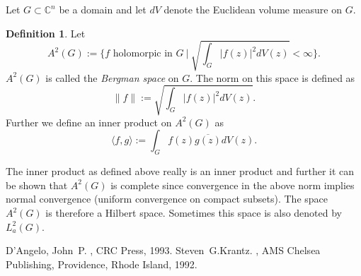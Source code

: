 \documentclass[12pt]{article}
\theoremstyle{theorem}
\theoremstyle{definition}
\newtheorem*{defn}{Definition}
\begin{document}
Let $G \subset {\mathbb{C}}^n$ be a domain and let
$dV$ denote the Euclidean volume measure on $G$.

\begin{defn}
Let
\begin{equation*}
A^2(G) :=
\Big\{ f \text{ holomorpic in } G ~\Big|~
\sqrt{ \int_G \lvert f(z) \rvert^2 dV(z) } < \infty \Big\} .
\end{equation*}
$A^2(G)$ is called the {\em Bergman space} on $G$.  The norm on this space
is defined as
\begin{equation*}
\lVert f \rVert :=
\sqrt{ \int_G \lvert f(z) \rvert^2 dV(z) } .
\end{equation*}
Further we define an inner product on $A^2(G)$ as
\begin{equation*}
\langle f , g \rangle :=
\int_G f(z) \overline{g(z)} dV(z) .
\end{equation*}
\end{defn}

The inner product as defined above really is an inner product and further
it can be shown that $A^2(G)$ is complete since convergence in the above norm implies normal convergence (uniform convergence on
compact subsets).  The space $A^2(G)$ is therefore a Hilbert space.
Sometimes this space is also denoted by $L_a^2(G)$.

\begin{thebibliography}{9}
D'Angelo, John~P.
{\em {}},
CRC Press, 1993.
Steven~G.\@ Krantz.
{\em {}},
AMS Chelsea Publishing, Providence, Rhode Island, 1992.
\end{thebibliography}
\end{document}
